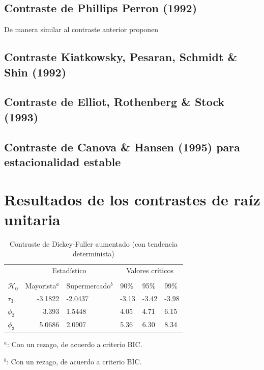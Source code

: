 \documentclass[12pt, twoside]{book}\usepackage[]{graphicx}\usepackage[]{color}
\numberwithin{equation}{section}
\numberwithin{theorem}{section}
\numberwithin{teorema}{section}
\numberwithin{defi}{section}
\numberwithin{prop}{section}
\numberwithin{defi}{section}
\theoremstyle{plain}
\begin{document}
\subsection{Contraste de Phillips Perron (1992)}

De manera similar al contraste anterior \cite{phillips1988} proponen 
\subsection{Contraste Kiatkowsky, Pesaran, Schmidt \& Shin (1992)}
\subsection{Contraste de Elliot, Rothenberg \& Stock (1993)} 

\subsection{Contraste de Canova \& Hansen (1995) para estacionalidad estable}

\section{Resultados de los contrastes de raíz unitaria}




\begin{table}[H]
\centering
\begin{threeparttable}
\caption{Contraste de Dickey-Fuller aumentado (con tendencia determinista)}
\begin{tabular}{@{}lrllll@{}}
\toprule
\multicolumn{1}{l}{} & \multicolumn{2}{c}{Estadístico} &
\multicolumn{3}{c}{Valores críticos} \\
\cmidrule(l){2-3} \cmidrule(l){4-6} \\
\multicolumn{1}{l}{$\mathcal{H}_0$} & \multicolumn{1}{c}{Mayorista$^{a}$} &
 \multicolumn{1}{c}{Supermercado$^{b}$} &
\multicolumn{1}{l}{90\%}&
\multicolumn{1}{l}{95\%}&
\multicolumn{1}{l}{99\%}
\\
\midrule
$\tau_{3} $  & -3.1822 &  -2.0437 & -3.13 & -3.42 & -3.98 \\
$\phi_{2} $  & 3.393   &  1.5448 & 4.05 & 4.71 & 6.15 \\
$\phi_{3}$   & 5.0686  &  2.0907 &    5.36    &   6.30   &  8.34    \\ 
\bottomrule
\end{tabular}
\label{tab-2}
\begin{tablenotes}
\small 
\item $^{a}$: Con un rezago, de acuerdo a criterio BIC. 
\item $^{b}$: Con un rezago, de acuerdo a criterio BIC. 
\end{tablenotes}
\end{threeparttable}
\end{table}
\end{document}
